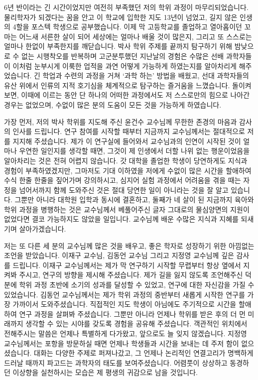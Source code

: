     
6년 반이라는 긴 시간이었지만 여전히 부족했던 저의 학위 과정이 마무리되었습니다. 물리학자가 되겠다는 꿈을 안고 이 학교에 입학한 지도 13년이 넘었고, 길지 않은 인생의 4할을 포스텍 학생으로 공부했습니다. 이제 막 고등학교를 졸업하고 열아홉이던 꼬마는 어느새 서른한 살이 되어 세상에는 얼마나 배울 것이 많은지, 그리고 또 스스로는 얼마나 한없이 부족한지를 깨닫습니다. 박사 학위 주제를 끝까지 탐구하기 위해 밤낮으로 수 없는 시행착오를 반복하며 고군분투했던 지난날의 경험은 수많은 선배 과학자들이 이처럼 눈부시게 이룩한 업적을 과연 어떻게 가능하게 하였는지를 알아차리게 해주었습니다. 긴 학업과 수련의 과정을 거쳐 `과학 하는' 방법을 배웠고, 선대 과학자들의 유산 위에서 인류의 지적 호기심을 체계적으로 탐구하는 즐거움을 느꼈습니다. 돌이켜보면, 이때에 이르는 동안 단 하나의 어떠한 과정에서도 저 스스로만의 힘으로 나아간 경우는 없었으며, 수없이 많은 분의 도움이 모든 것을 가능하게 하였습니다.

가장 먼저, 저의 박사 학위를 지도해 주신 윤건수 교수님께 무한한 존경의 마음과 감사의 인사를 드립니다. 연구 참여를 시작할 때부터 지금까지 교수님께서는 절대적으로 저를 지지해 주셨습니다. 제가 이 연구실에 들어와서 교수님과의 인연이 시작된 것이 얼마나 우연한 일인지를 생각할 때면, 그것이 제 인생에서 더할 나위 없는 행운이었음을 알아차리는 것은 전혀 어렵지 않습니다. 갓 대학을 졸업한 학생이 당연하게도 지식과 경험이 부족하였겠지만, 그마저도 기대 이하였을 저에게 수없이 많은 시간을 할애하여 수식 한줄 한줄을 짚어가며 강의하시고, 심지어 실험 과정에서 어려움을 겪을 때는 자정을 넘어서까지 함께 도와주신 것은 절대 당연한 일이 아니라는 것을 잘 알고 있습니다. 그뿐만 아니라 대학원 입학과 동시에 결혼하고, 둘째가 네 살이 된 지금까지 육아와 학위 과정을 병행하는 것은 교수님께서 베풀어주신 글자 그대로의 물심양면의 지원이 없었다면 결코 가능하지도 않았을 일입니다. 교수님께 배운 수많은 지식과 지혜를 되새기며 살아가겠습니다.

저는 또 다른 세 분의 교수님께 많은 것을 배우고, 좋은 학자로 성장하기 위한 아낌없는 조언을 받았습니다. 이재구 교수님, 김동언 교수님 그리고 지정영 교수님께 깊은 감사를 드립니다. 이재구 교수님께서는 제가 막 연구하기 시작할 무렵부터 항상 옆에서 지켜봐 주시고, 연구의 방향을 제시해 주셨습니다. 제가 길을 잃지 않도록 조언해주신 덕분에 학위 과정 초반에 소기의 성과를 달성할 수 있었고, 연구에 대한 자신감을 가질 수 있었습니다. 김동언 교수님께서는 제가 학위 과정의 중반부터 새롭게 시작한 연구를 가장 가까이서 도와주셨습니다. 직접적인 지도 학생이 아님에도 주기적으로 시간을 할애하여 연구 과정을 살펴봐 주셨습니다. 그뿐만 아니라 언제나 학위를 받은 후의 더 먼 미래까지 생각할 수 있는 시야를 갖도록 경험을 공유해 주셨습니다. 객관적인 위치에서 전해주시는 말씀은 언제나 특별하게 다가왔고, 앞으로도 늘 잊지 않겠습니다. 지정영 교수님께서는 포항을 방문하실 때면 언제나 학생들과 시간을 보내는 데 주저 함이 없으셨습니다. 대화는 다양한 주제로 퍼져나갔고, 그 언제나 논리적인 연결고리가 명백하게 드러날 때까지 파고드는 과학자의 태도를 보여주셨습니다. 어렴풋이 상상하고 동경하던 이상향을 실천하시는 모습은 제 평생의 귀감으로 남을 것입니다.

